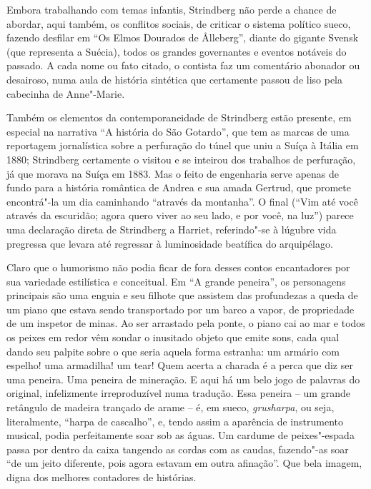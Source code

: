 Embora trabalhando com temas infantis, Strindberg não perde a chance de 
abordar, aqui também, os conflitos sociais, de criticar o sistema
político sueco, fazendo desfilar em ``Os Elmos Dourados de
\r Alleberg'', diante do gigante Svensk (que representa a Suécia), todos os
grandes governantes e eventos notáveis do passado. A cada nome ou fato
citado, o contista faz um comentário abonador ou desairoso, numa aula
de história sintética que certamente passou de liso pela cabecinha de
Anne"-Marie.

Também os elementos da contemporaneidade de Strindberg estão presente,
em especial na narrativa ``A história do São Gotardo'', que tem as
marcas de uma reportagem jornalística sobre a perfuração do túnel que
uniu a Suíça à Itália em 1880; Strindberg certamente o visitou e se
inteirou dos trabalhos de perfuração, já que morava na Suíça em 1883.
Mas o feito de engenharia serve apenas de fundo para a história
romântica de Andrea e sua amada Gertrud, que promete encontrá"-la um
dia caminhando ``através da montanha''. O final (``Vim até você através da
escuridão; agora quero viver ao seu lado, e por você, na luz'') parece
uma declaração direta de Strindberg a Harriet, referindo"-se à lúgubre
vida pregressa que levara até regressar à luminosidade beatífica do
arquipélago.

Claro que o humorismo não podia ficar de fora desses contos encantadores
por sua variedade estilística e conceitual. Em ``A grande
peneira'', os personagens principais são uma enguia e seu filhote que
assistem das profundezas a queda de um piano que estava sendo
transportado por um barco a vapor, de propriedade de um inspetor de
minas. Ao ser arrastado pela ponte, o piano cai ao mar e todos os
peixes em redor vêm sondar o inusitado objeto que emite sons, cada qual
dando seu palpite sobre o que seria aquela forma estranha: um armário
com espelho! uma armadilha! um tear! Quem acerta a charada é a perca
que diz ser uma peneira. Uma peneira de mineração. E aqui há um belo
jogo de palavras do original, infelizmente irreproduzível numa
tradução. Essa peneira -- um grande retângulo de madeira trançado
de arame -- é, em sueco, \textit{grusharpa}, ou seja, literalmente,
``harpa de cascalho'', e, tendo assim a aparência de instrumento musical,
podia perfeitamente soar sob as águas. Um cardume de peixes"-espada
passa por dentro da caixa tangendo as cordas com as caudas,
fazendo"-as soar ``de um jeito diferente, pois agora estavam em outra
afinação''. Que bela imagem, digna dos melhores contadores de
histórias.

